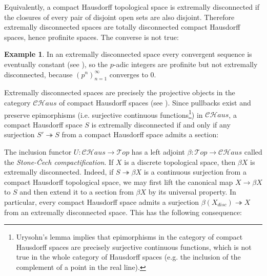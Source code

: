 \documentclass[11pt,A4]{article}
\theoremstyle{plain}
\theoremstyle{definition}
\newtheorem{exa}[thm]{Example}
\theoremstyle{remark}
\newcommand{\1}{\mathbbm{1}}
\newcommand{\Top}{\mathscr{T}op}
\newcommand{\CHaus}{\mathscr{CH}aus}
\begin{document}
Equivalently, a compact Hausdorff topological space is extremally disconnected if the closures of every pair of disjoint open sets are also disjoint.
Therefore extremally disconnected spaces are totally disconnected compact Hausdorff spaces, hence profinite spaces.
The converse is not true:

\begin{exa}
    In an extremally disconnected space every convergent sequence is eventually constant (see \cite[Theorem 1.3]{gle58}), so the $p$-adic integers are profinite but not extremally disconnected, because $(p^{n})_{n=1}^{\infty}$ converges to $0$.
\end{exa}
    
Extremally disconnected spaces are precisely the projective objects in the category $\CHaus$ of compact Hausdorff spaces (see \cite[Theorem 2.5]{gle58}).
Since pullbacks exist and preserve epimorphisms (i.e. surjective continuous functions\footnote{Urysohn's lemma implies that epimorphisms in the category of compact Hausdorff spaces are precisely surjective continuous functions, which is not true in the whole category of Hausdorff spaces (e.g. the inclusion of the complement of a point in the real line).}) in $\CHaus$, a compact Hausdorff space $S$ is extremally disconnected if and only if any surjection $S'\twoheadrightarrow S$ from a compact Hausdorff space admits a section:
\begin{center}
\end{center}

The inclusion functor $U\colon \CHaus\to \Top$ has a left adjoint $\beta\colon \Top\to \CHaus$ called the \textit{Stone-\v{C}ech compactification}.
If $X$ is a discrete topological space, then $\beta X$ is extremally disconnected.
Indeed, if $S\twoheadrightarrow \beta X$ is a continuous surjection from a compact Hausdorff topological space, we may first lift the canonical map $X\to \beta X$ to $S$ and then extend it to a section from $\beta X$ by its universal property.
In particular, every compact Hausdorff space admits a surjection $\beta(X_{disc})\twoheadrightarrow X$ from an extremally disconnected space.
This has the following consequence:
\end{document}
